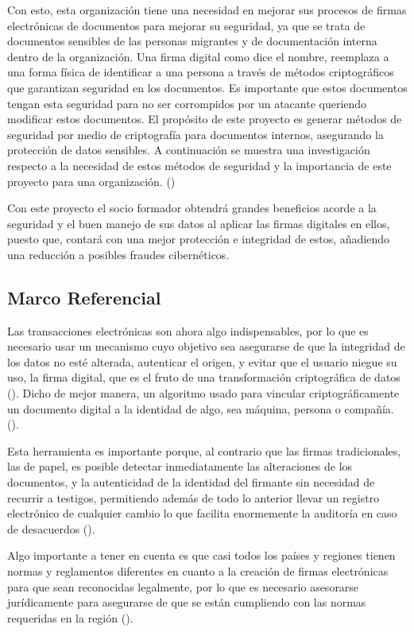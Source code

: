 \documentclass[12pt]{article}
\begin{document}
Con esto, esta organización tiene una necesidad en mejorar sus procesos de firmas electrónicas de documentos para mejorar su seguridad, ya que se trata de documentos sensibles de las personas migrantes y de documentación interna dentro de la organización. Una firma digital como dice el nombre, reemplaza a una forma física de identificar a una persona a través de métodos criptográficos que garantizan seguridad en los documentos. Es importante que estos documentos tengan esta seguridad para no ser corrompidos por un atacante queriendo modificar estos documentos. El propósito de este proyecto es generar métodos de seguridad por medio de criptografía para documentos internos, asegurando la protección de datos sensibles. A continuación se muestra una investigación respecto a la necesidad de estos métodos de seguridad y la importancia de este proyecto para una organización. (\cite{CasaMonarca})

Con este proyecto el socio formador obtendrá grandes beneficios acorde a la seguridad y el buen manejo de sus datos al aplicar las firmas digitales en ellos, puesto que, contará con una mejor protección e integridad de estos, añadiendo una reducción a posibles fraudes cibernéticos. 
\newpage

\subsection{Marco Referencial} %
Las transacciones electrónicas son ahora algo indispensables, por lo que es necesario usar un mecanismo cuyo objetivo sea asegurarse de que la integridad de los datos no esté alterada, autenticar el origen, y evitar que el usuario niegue su uso, la firma digital, que es el fruto de una transformación criptográfica de datos (\cite{NIST:2023}). Dicho de mejor manera, un algoritmo usado para vincular criptográficamente un documento digital a la identidad de algo, sea máquina, persona o compañía.  (\cite{Entrust}).  

Esta herramienta es importante porque, al contrario que las firmas tradicionales, las de papel, es posible detectar inmediatamente las alteraciones de los documentos, y  la autenticidad de la identidad del firmante sin necesidad de recurrir a testigos, permitiendo además de todo lo anterior llevar un registro electrónico de cualquier cambio lo que facilita enormemente la auditoría en caso de desacuerdos (\cite{Entrust}).

Algo importante a tener en cuenta es que casi todos los países y regiones tienen normas y reglamentos diferentes en cuanto a la creación de firmas electrónicas para que sean reconocidas legalmente, por lo que es necesario asesorarse jurídicamente para asegurarse de que se están cumpliendo con las normas requeridas en la región (\cite{Entrust}).
\end{document}

